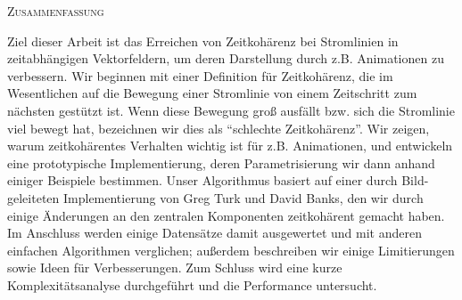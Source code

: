 
\begin{center}
  \textsc{Zusammenfassung}
\end{center}
%
Ziel dieser Arbeit ist das Erreichen von Zeitkohärenz bei Stromlinien
in zeitabhängigen Vektorfeldern, um deren Darstellung durch z.B. Animationen zu verbessern.
Wir beginnen mit einer Definition für Zeitkohärenz, die im Wesentlichen auf die
Bewegung einer Stromlinie von einem Zeitschritt zum nächsten gestützt ist.
Wenn diese Bewegung groß ausfällt bzw. sich die Stromlinie viel bewegt hat,
bezeichnen wir dies als ``schlechte Zeitkohärenz''.
Wir zeigen, warum zeitkohärentes Verhalten wichtig ist für z.B. Animationen,
und entwickeln eine prototypische Implementierung, deren Parametrisierung
wir dann anhand einiger Beispiele bestimmen.
Unser Algorithmus basiert auf einer durch Bild-geleiteten Implementierung von Greg Turk und David Banks,
den wir durch einige Änderungen an den zentralen Komponenten zeitkohärent gemacht haben.
Im Anschluss werden einige Datensätze damit ausgewertet und mit anderen einfachen Algorithmen verglichen;
außerdem beschreiben wir einige Limitierungen sowie Ideen für Verbesserungen.
Zum Schluss wird eine kurze Komplexitätsanalyse durchgeführt und die Performance untersucht.
\cleardoublepage
